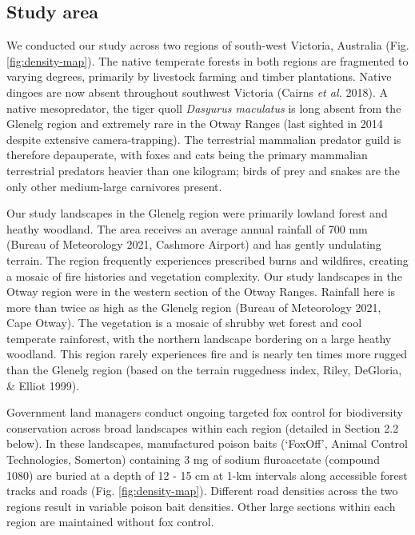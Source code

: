 \documentclass[preprint, 3p, authoryear]{elsarticle} %
\begin{document}
\hypertarget{study-area}{%
\subsection{Study area}\label{study-area}}

We conducted our study across two regions of south-west Victoria, Australia (Fig. \ref{fig:density-map}). The native temperate forests in both regions are fragmented to varying degrees, primarily by livestock farming and timber plantations. Native dingoes are now absent throughout southwest Victoria (Cairns \emph{et al.} 2018). A native mesopredator, the tiger quoll \emph{Dasyurus maculatus} is long absent from the Glenelg region and extremely rare in the Otway Ranges (last sighted in 2014 despite extensive camera-trapping). The terrestrial mammalian predator guild is therefore depauperate, with foxes and cats being the primary mammalian terrestrial predators heavier than one kilogram; birds of prey and snakes are the only other medium-large carnivores present.

Our study landscapes in the Glenelg region were primarily lowland forest and heathy woodland. The area receives an average annual rainfall of 700 mm (Bureau of Meteorology 2021, Cashmore Airport) and has gently undulating terrain. The region frequently experiences prescribed burns and wildfires, creating a mosaic of fire histories and vegetation complexity. Our study landscapes in the Otway region were in the western section of the Otway Ranges. Rainfall here is more than twice as high as the Glenelg region (Bureau of Meteorology 2021, Cape Otway). The vegetation is a mosaic of shrubby wet forest and cool temperate rainforest, with the northern landscape bordering on a large heathy woodland. This region rarely experiences fire and is nearly ten times more rugged than the Glenelg region (based on the terrain ruggedness index, Riley, DeGloria, \& Elliot 1999).

Government land managers conduct ongoing targeted fox control for biodiversity conservation across broad landscapes within each region (detailed in Section 2.2 below). In these landscapes, manufactured poison baits (`FoxOff', Animal Control Technologies, Somerton) containing 3 mg of sodium fluroacetate (compound 1080) are buried at a depth of 12 - 15 cm at 1-km intervals along accessible forest tracks and roads (Fig. \ref{fig:density-map}). Different road densities across the two regions result in variable poison bait densities. Other large sections within each region are maintained without fox control.
\end{document}
